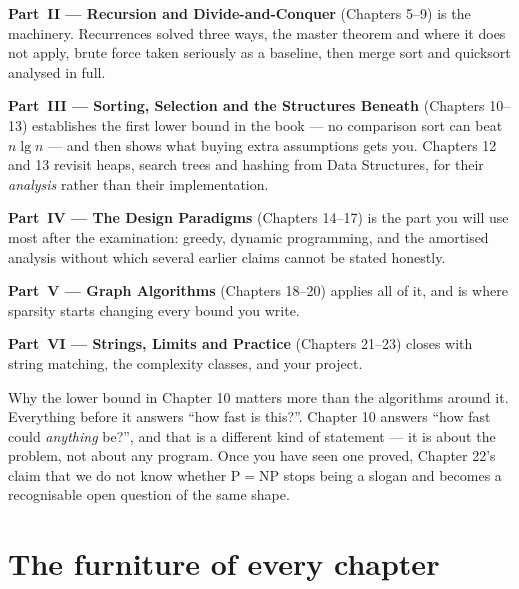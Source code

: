 \textbf{Part~II --- Recursion and Divide-and-Conquer} (Chapters 5--9) is the
machinery. Recurrences solved three ways, the master theorem and where it does
not apply, brute force taken seriously as a baseline, then merge sort and
quicksort analysed in full.

\textbf{Part~III --- Sorting, Selection and the Structures Beneath}
(Chapters 10--13) establishes the first lower bound in the book --- no
comparison sort can beat $n \lg n$ --- and then shows what buying extra
assumptions gets you. Chapters 12 and 13 revisit heaps, search trees and
hashing from Data Structures, for their \emph{analysis} rather than their
implementation.

\textbf{Part~IV --- The Design Paradigms} (Chapters 14--17) is the part you will
use most after the examination: greedy, dynamic programming, and the amortised
analysis without which several earlier claims cannot be stated honestly.

\textbf{Part~V --- Graph Algorithms} (Chapters 18--20) applies all of it, and is
where sparsity starts changing every bound you write.

\textbf{Part~VI --- Strings, Limits and Practice} (Chapters 21--23) closes with
string matching, the complexity classes, and your project.

\begin{conceptbox}
Why the lower bound in Chapter 10 matters more than the algorithms around it.
Everything before it answers ``how fast is this?''. Chapter 10 answers ``how
fast could \emph{anything} be?'', and that is a different kind of statement ---
it is about the problem, not about any program. Once you have seen one proved,
Chapter 22's claim that we do not know whether $\mathrm{P} = \mathrm{NP}$ stops
being a slogan and becomes a recognisable open question of the same shape.
\end{conceptbox}

\section*{The furniture of every chapter}

